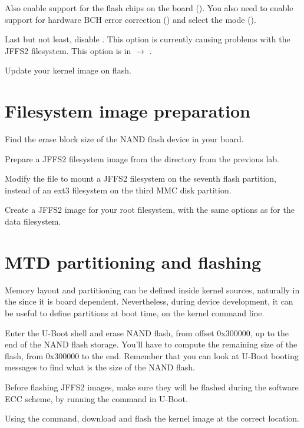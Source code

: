 Also enable support for the flash chips on the board
(). You also need to enable support for
hardware BCH error correction () and select
the  mode
().

Last but not least, disable . This option is
currently causing problems with the JFFS2 filesystem. This option is
in  $\rightarrow$
.

Update your kernel image on flash.

\section{Filesystem image preparation}

Find the erase block size of the NAND flash device in your board.

Prepare a JFFS2 filesystem image from the 
directory from the previous lab.

Modify the  file to mount a JFFS2 filesystem on
the seventh flash partition, instead of an ext3 filesystem on the
third MMC disk partition.

Create a JFFS2 image for your root filesystem, with the same options
as for the data filesystem.

\section{MTD partitioning and flashing}

Memory layout and partitioning can be defined inside kernel sources,
naturally in the  since it is
board dependent. Nevertheless, during device development, it can be
useful to define partitions at boot time, on the kernel command line.

Enter the U-Boot shell and erase NAND flash, from offset 0x300000,
up to the end of the NAND flash storage. You'll have to compute the
remaining size of the flash, from 0x300000 to the end. Remember that
you can look at U-Boot booting messages to find what is the size of
the NAND flash.

Before flashing JFFS2 images, make sure they will be flashed during
the software ECC scheme, by running the  command in
U-Boot.

Using the  command, download and flash the kernel image at
the correct location.

